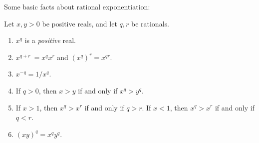 Some basic facts about rational exponentiation:

\begin{lemma} \label{lem 5.6.9}
Let \(x, y > 0\) be positive reals, and let \(q, r\) be rationals.
\begin{enumerate}
    \item \(x^q\) is a \emph{positive} real.
    \item \(x^{q+r}\ = x^q x^r\) and \((x^q)^r = x^{qr}\).
    \item \(x^{-q} = 1/x^q\).
    \item If \(q > 0\), then \(x > y\) if and only if \(x^q > y^q\).
    \item If \(x > 1\), then \(x^q > x^r\) if and only if \(q > r\). If \(x < 1\), then \(x^q > x^r\) if and only if \(q < r\).
    \item \((xy)^q = x^q y^q\).
\end{enumerate}
\end{lemma}

